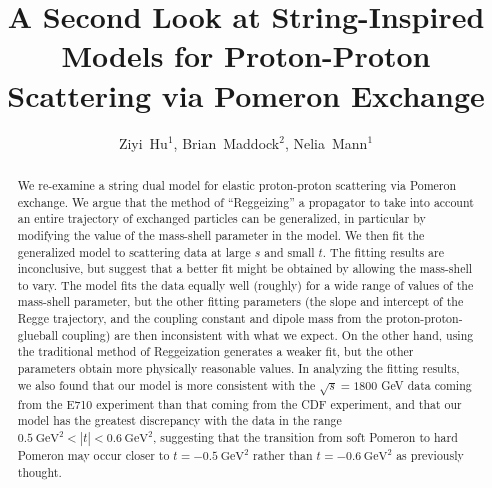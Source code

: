 \documentclass[aps, prd, preprintnumbers, floatfix, showpacs, showkeys, nofootinbib, 10pt]{revtex4-1}
\begin{document}
\preprint{\today}


\title{A Second Look at String-Inspired Models for Proton-Proton Scattering via Pomeron Exchange}

\author{Ziyi~Hu$^1$, Brian~Maddock$^2$, Nelia~Mann$^1$}


\begin{abstract}
We re-examine a string dual model for elastic proton-proton scattering via Pomeron exchange.  We argue that the method of ``Reggeizing'' a propagator to take into account an entire trajectory of exchanged particles can be generalized, in particular by modifying the value of the mass-shell parameter in the model.  We then fit the generalized model to scattering data at large $s$ and small $t$.  The fitting results are inconclusive, but suggest that a better fit might be obtained by allowing the mass-shell to vary.  The model fits the data equally well (roughly) for a wide range of values of the mass-shell parameter, but the other fitting parameters (the slope and intercept of the Regge trajectory, and the coupling constant and dipole mass from the proton-proton-glueball coupling) are then inconsistent with what we expect.  On the other hand, using the traditional method of Reggeization generates a weaker fit, but the other parameters obtain more physically reasonable values.  In analyzing the fitting results, we also found that our model is more consistent with the $\sqrt{s} = 1800$ GeV data coming from the E710 experiment than that coming from the CDF experiment, and that our model has the greatest discrepancy with the data in the range $0.5 \ \mathrm{GeV}^2 < |t| < 0.6 \ \mathrm{GeV}^2$, suggesting that the transition from soft Pomeron to hard Pomeron may occur closer to $t = -0.5 \ \mathrm{GeV}^2$ rather than $t = -0.6 \ \mathrm{GeV}^2$ as previously thought.
\end{abstract}



\end{document}
